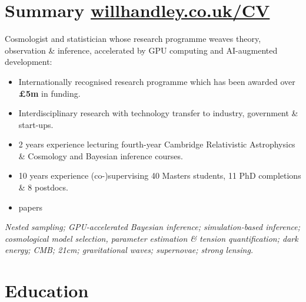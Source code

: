 \documentclass[11pt,a4paper,sans]{moderncv}
\begin{document}
\makecvtitle{}
\vspace{-10pt}
\section{Summary \hfill\href{www.willhandley.co.uk/CV}{willhandley.co.uk/CV}}
Cosmologist and statistician whose research programme weaves theory, observation \& inference, accelerated by GPU computing and AI-augmented development:
\begin{itemize}
    \item Internationally recognised research programme which has been awarded over \textbf{\pounds5m} in funding.
    \item Interdisciplinary research with technology transfer to industry, government \& start-ups.
    \item 2 years experience lecturing fourth-year Cambridge Relativistic Astrophysics \& Cosmology and Bayesian inference courses.
    \item 10 years experience (co-)supervising 40 Masters students, 11 PhD completions \& 8 postdocs.
    \item {} papers
\end{itemize}
\textit{\noindent
Nested sampling; GPU-accelerated Bayesian inference; simulation-based inference; cosmological model selection, parameter estimation \& tension quantification; dark energy; CMB; 21cm; gravitational waves; supernovae; strong lensing.
}

\section{Education}
\end{document}
